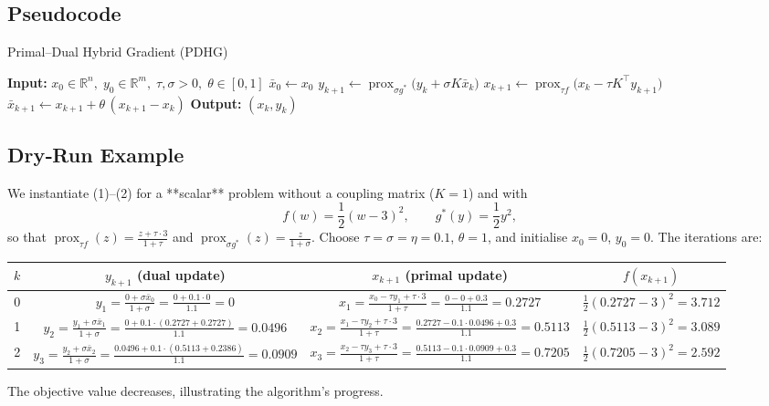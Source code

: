 \documentclass{article}
\newcommand{\prox}{\operatorname{prox}}
\begin{document}
\subsection*{Pseudocode}
\begin{algorithm}[H]
\caption{Primal–Dual Hybrid Gradient (PDHG)}
\begin{algorithmic}[1]
\State \textbf{Input:} $x_{0}\in\mathbb{R}^{n},\;y_{0}\in\mathbb{R}^{m},\;
\tau,\sigma>0,\;\theta\in[0,1]$ 
\State $\bar x_{0}\gets x_{0}$
    \State $y_{k+1}\gets \prox_{\sigma g^{*}}\!\bigl(y_k+\sigma K\bar x_k\bigr)$
    \State $x_{k+1}\gets \prox_{\tau f}\!\bigl(x_k-\tau K^{\!\top}y_{k+1}\bigr)$
    \State $\bar x_{k+1}\gets x_{k+1}+ \theta\,(x_{k+1}-x_k)$
\EndFor
\State \textbf{Output:} $(x_k,y_k)$
\end{algorithmic}
\end{algorithm}

\subsection*{Dry‑Run Example}
We instantiate (1)–(2) for a **scalar** problem without a coupling matrix ($K=1$) and with
\[
f(w)=\frac12 (w-3)^2,\qquad g^{*}(y)=\frac12 y^{2},
\]
so that $\prox_{\tau f}(z)=\frac{z+\tau\cdot3}{1+\tau}$ and $\prox_{\sigma g^{*}}(z)=\frac{z}{1+\sigma}$.
Choose $\tau=\sigma=\eta=0.1$, $\theta=1$, and initialise $x_{0}=0$, $y_{0}=0$.
The iterations are:

\begin{center}
\begin{tabular}{c|c|c|c}
$k$ & $y_{k+1}$ (dual update) & $x_{k+1}$ (primal update) & $f(x_{k+1})$ \\ \hline
0 &
$\displaystyle y_{1}= \frac{0+\sigma\bar x_{0}}{1+\sigma}
= \frac{0+0.1\cdot0}{1.1}=0$ &
$\displaystyle x_{1}= \frac{x_{0}-\tau y_{1}+ \tau\cdot3}{1+\tau}
= \frac{0-0+0.3}{1.1}=0.2727$ &
$\frac12(0.2727-3)^{2}=3.712$ \\ \hline
1 &
$y_{2}= \frac{y_{1}+\sigma\bar x_{1}}{1+\sigma}
= \frac{0+0.1\cdot(0.2727+0.2727)}{1.1}=0.0496$ &
$x_{2}= \frac{x_{1}-\tau y_{2}+ \tau\cdot3}{1+\tau}
= \frac{0.2727-0.1\cdot0.0496+0.3}{1.1}=0.5113$ &
$\frac12(0.5113-3)^{2}=3.089$ \\ \hline
2 &
$y_{3}= \frac{y_{2}+\sigma\bar x_{2}}{1+\sigma}
= \frac{0.0496+0.1\cdot(0.5113+0.2386)}{1.1}=0.0909$ &
$x_{3}= \frac{x_{2}-\tau y_{3}+ \tau\cdot3}{1+\tau}
= \frac{0.5113-0.1\cdot0.0909+0.3}{1.1}=0.7205$ &
$\frac12(0.7205-3)^{2}=2.592$ 
\end{tabular}
\end{center}
The objective value decreases, illustrating the algorithm’s progress.
\end{document}

